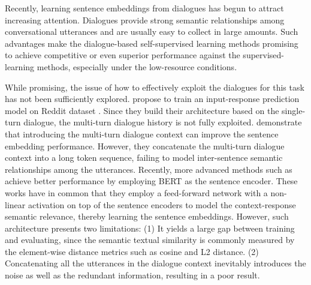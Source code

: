 \documentclass[11pt]{article}
\begin{document}
Recently, learning sentence embeddings from dialogues has begun to attract increasing attention.
Dialogues provide strong semantic relationships among conversational utterances and are usually easy to collect in large amounts.
Such advantages make the dialogue-based self-supervised learning methods promising to achieve competitive or even superior performance against the supervised-learning methods, especially under the low-resource conditions.

While promising, the issue of how to effectively exploit the dialogues for this task has not been sufficiently explored.
\citet{co_dan} propose to train an input-response prediction model on Reddit dataset \cite{reddit}.
Since they build their architecture based on the single-turn dialogue, the multi-turn dialogue history is not fully exploited.
\citet{convert} demonstrate that introducing the multi-turn dialogue context can improve the sentence embedding performance.
However, they concatenate the multi-turn dialogue context into a long token sequence, failing to model inter-sentence semantic relationships among the utterances.
Recently, more advanced methods such as \cite{sent_bert} achieve better performance by employing BERT \cite{bert} as the sentence encoder.
These works have in common that they employ a feed-forward network with a non-linear activation on top of the sentence encoders to model the context-response semantic relevance, thereby learning the sentence embeddings.
However, such architecture presents two limitations: (1) It yields a large gap between training and evaluating, since the semantic textual similarity is commonly measured by the element-wise distance metrics such as cosine and L2 distance.
(2) Concatenating all the utterances in the dialogue context inevitably introduces the noise as well as the redundant information, resulting in a poor result.
\end{document}
